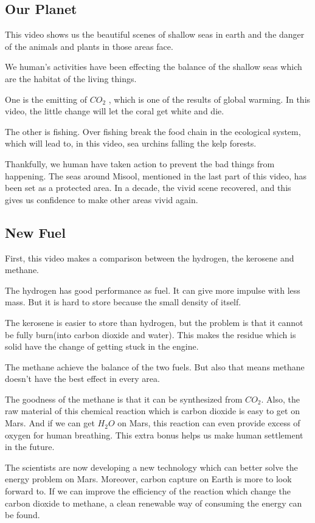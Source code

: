 \documentclass{article}
\begin{document}
\subsection{Our Planet} This video shows us the beautiful scenes of shallow
 seas in earth and the danger of the animals and plants in those areas face.

We human's activities have been effecting the balance of the shallow seas
which are the habitat of the living things.

One is the emitting of $CO_2$ , which is one of the results of global warming.
In this video, the little change will let the coral get white and die.

The other is fishing. Over fishing break the food chain in the ecological
system, which will lead to, in this video, sea urchins falling the kelp
forests.

Thankfully, we human have taken action to prevent the bad things from
happening. The seas around Misool, mentioned in the last part of this video,
has been set as a protected area. In a decade, the vivid scene recovered, and
this gives us confidence to make other areas vivid again.

\subsection{New Fuel} First, this video makes a comparison between the
 hydrogen, the kerosene and methane.

The hydrogen has good performance as fuel. It can give more impulse with less
mass. But it is hard to store because the small density of itself.

The kerosene is easier to store than hydrogen, but the problem is that it
cannot be fully burn(into carbon dioxide and water). This makes the residue
which is solid have the change of getting stuck in the engine.

The methane achieve the balance of the two fuels. But also that means methane
doesn't have the best effect in every area.

The goodness of the methane is that it can be synthesized from $CO_2$. Also,
the raw material of this chemical reaction which is carbon dioxide is easy to
get on Mars. And if we can get $H_2O$ on Mars, this reaction can even provide
excess of oxygen for human breathing. This extra bonus helps us make human
settlement in the future.

The scientists are now developing a new technology which can better solve the
energy problem on Mars. Moreover, carbon capture on Earth is more to look
forward to. If we can improve the efficiency of the reaction which change the
carbon dioxide to methane, a clean renewable way of consuming the energy can
be found.
\end{document}
